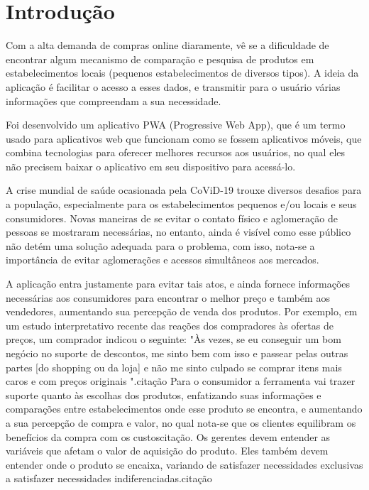 \section{Introdução}

Com a alta demanda de compras online diaramente, vê se a dificuldade de encontrar algum mecanismo de comparação e pesquisa de produtos em estabelecimentos locais (pequenos estabelecimentos de diversos tipos). A ideia da aplicação é facilitar o acesso a esses dados, e transmitir para o usuário várias informações que compreendam a sua necessidade.

Foi desenvolvido um aplicativo PWA (Progressive Web App), que é um termo usado para aplicativos web que funcionam como se fossem aplicativos móveis, que combina tecnologias para oferecer melhores recursos aos usuários, no qual eles não precisem baixar o aplicativo em seu dispositivo para acessá-lo.

A crise mundial de saúde ocasionada pela CoViD-19 trouxe diversos desafios para a população, especialmente para os estabelecimentos pequenos e/ou locais e seus consumidores. Novas maneiras de se evitar o contato físico e aglomeração de pessoas se mostraram necessárias, no entanto, ainda é visível como esse público não detém uma solução adequada para o problema, com isso, nota-se a importância de evitar aglomerações e acessos simultâneos aos mercados.

A aplicação entra justamente para evitar tais atos, e ainda fornece informações necessárias aos consumidores para encontrar o melhor preço e também aos vendedores, aumentando sua percepção de venda dos produtos. Por exemplo, em um estudo interpretativo recente das reações dos compradores às ofertas de preços, um comprador indicou o seguinte: "Às vezes, se eu conseguir um bom negócio no suporte de descontos, me sinto bem com isso e passear pelas outras partes [do shopping ou da loja] e não me sinto culpado se comprar itens mais caros e com preços originais ".{citação} Para o consumidor a ferramenta vai trazer suporte quanto às escolhas dos produtos, enfatizando suas informações e comparações entre estabelecimentos onde esse produto se encontra, e aumentando a sua percepção de compra e valor, no qual nota-se que os clientes equilibram os benefícios da compra com os custos{citação}. Os gerentes devem entender as variáveis que afetam o valor de aquisição do produto. Eles também devem entender onde o produto se encaixa, variando de satisfazer necessidades exclusivas a satisfazer necessidades indiferenciadas.{citação}



